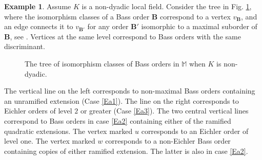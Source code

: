 \documentclass{amsart}
\theoremstyle{definition}
\newtheorem{example}[theorem]{Example}
\newcommand\alge{\mathbb{M}}
\newcommand\Ba{\mathbf B}
\begin{document}
\begin{example}
Assume $K$ is a non-dyadic local field.
Consider the tree in Fig. \ref{nbh1}, where
the isomorphism classes of a Bass order
$\Ba$ correspond to a vertex $v_{\Ba}$, 
and an edge connects it to $v_{\Ba'}$
for any order $\Ba'$ isomorphic
to a maximal suborder of $\Ba$, 
see \cite[Fig. 1]{Lem}.
Vertices at the same level correspond
to Bass orders with the same discriminant. 
      \begin{figure}[h!]
\begin{center}
\end{center}
\caption{The tree of isomorphism classes of Bass orders in $\alge $ when 
$K$ is non-dyadic.}\label{nbh1}
\end{figure}
The vertical line on the left corresponds to
non-maximal Bass orders containing
an unramified extension (Case \ref{Ea1}).
The line on the right corresponds to
Eichler orders of level $2$ or greater
(Case \ref{Ea3}).
The two central vertical lines correspond
to Bass orders in case \ref{Ea2}
containing either of
the ramified quadratic extensions.
The vertex marked $u$ corresponds to
an Eichler order of level one.
The vertex marked $w$ corresponds to
a non-Eichler Bass order containing copies
of either ramified extension.
The latter is also in case \ref{Ea2}.
   
\end{example}
\end{document}
